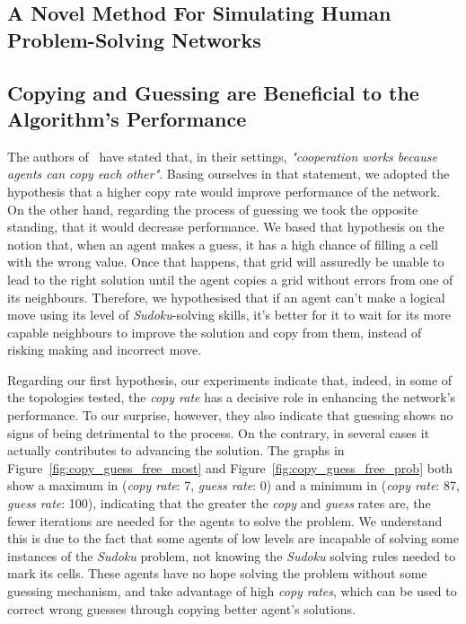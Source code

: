 \documentclass{article}
\begin{document}
\subsection{A Novel Method For Simulating Human Problem-Solving Networks}



\subsection{Copying and Guessing are Beneficial to the Algorithm's Performance}

The authors of~\cite{farenzena:collabem} have stated that, in their settings, {\em "cooperation works because agents can copy each other"}. Basing ourselves in that statement, we adopted the hypothesis that a higher copy rate would improve performance of the network. On the other hand, regarding the process of guessing we took the opposite standing, that it would decrease performance. We based that hypothesis on the notion that, when an agent makes a guess, it has a high chance of filling a cell with the wrong value. Once that happens, that grid will assuredly be unable to lead to the right solution until the agent copies a grid without errors from one of its neighbours. Therefore, we hypothesised that if an agent can't make a logical move using its level of \emph{Sudoku}-solving skills, it's better for it to wait for its more capable neighbours to improve the solution and copy from them, instead of risking making and incorrect move.

Regarding our first hypothesis, our experiments indicate that, indeed, in some of the topologies tested, the {\em copy rate} has a decisive role in enhancing the network's performance. To our surprise, however, they also indicate that guessing shows no signs of being detrimental to the process. On the contrary, in several cases it actually contributes to advancing the solution. The graphs in Figure~\ref{fig:copy_guess_free_most} and Figure~\ref{fig:copy_guess_free_prob} both show a maximum in ({\em copy rate}: 7, {\em guess rate}: 0) and a minimum in ({\em copy rate}: 87, {\em guess rate}: 100), indicating that the greater the {\em copy} and {\em guess} rates are, the fewer iterations are needed for the agents to solve the problem. We understand this is due to the fact that some agents of low levels are incapable of solving some instances of the {\em Sudoku} problem, not knowing the {\em Sudoku} solving rules needed to mark its cells. These agents have no hope solving the problem without some guessing mechanism, and take advantage of high {\em copy rates}, which can be used to correct wrong guesses through copying better agent's solutions.
\end{document}
